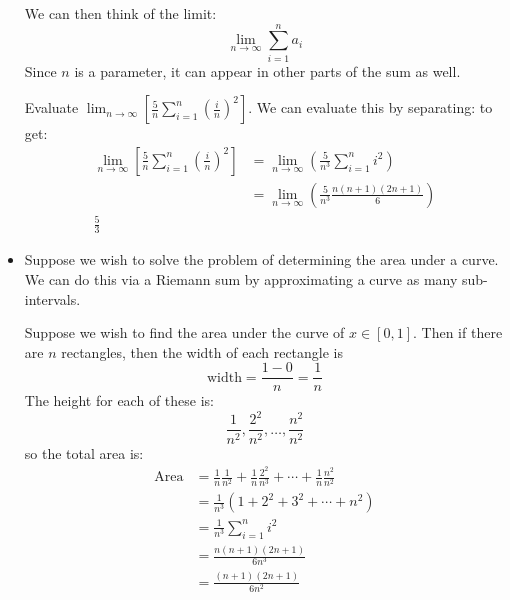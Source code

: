 \begin{itemize}
\begin{equation}
    \end{equation}
    We can then think of the limit:
    \begin{equation}
        \lim_{n\to\infty}\sum_{i=1}^na_i
        \label{eq:}
    \end{equation}
    Since $n$ is a parameter, it can appear in other parts of the sum as well.
    \begin{example}
        Evaluate $\lim_{n\to \infty}\left[\frac{5}{n}\sum_{i=1}^n\left(\frac{i}{n}\right)^2\right]$. We can evaluate this by separating: to get:
        \begin{align}
            \lim_{n\to \infty}\left[\frac{5}{n}\sum_{i=1}^n\left(\frac{i}{n}\right)^2\right] &= \lim_{n\to\infty} \left(\frac{5}{n^3}\sum_{i=1}^n i^2\right) \\ 
            &= \lim_{n\to\infty} \left(\frac{5}{n^3}\frac{n(n+1)(2n+1)}{6}\right) \\ 
            \frac{5}{3}
        \end{align}
    \end{example}
    \item Suppose we wish to solve the problem of determining the area under a curve. We can do this via a Riemann sum by approximating a curve as many sub-intervals.
    \begin{example}
        Suppose we wish to find the area under the curve of $x \in [0,1]$. Then if there are $n$ rectangles, then the width of each rectangle is
        \begin{equation}
            \text{width} = \frac{1-0}{n}=\frac{1}{n}
            \label{eq:}
        \end{equation}
        The height for each of these is:
        \begin{equation}
            \frac{1}{n^2},\frac{2^2}{n^2},\dots,\frac{n^2}{n^2}
            \label{eq:}
        \end{equation}
        so the total area is:
        \begin{align}
            \text{Area} &= \frac{1}{n}\frac{1}{n^2}+\frac{1}{n}\frac{2^2}{n^3}+\cdots+\frac{1}{n}\frac{n^2}{n^2} \\ 
            &= \frac{1}{n^3}(1+2^2+3^2+\cdots+n^2) \\ 
            &= \frac{1}{n^3}\sum_{i=1}^n i^2 \\ 
            &= \frac{n(n+1)(2n+1)}{6n^3} \\
            &= \frac{(n+1)(2n+1)}{6n^2} \\
        \end{align}

\end{example}
\end{itemize}
